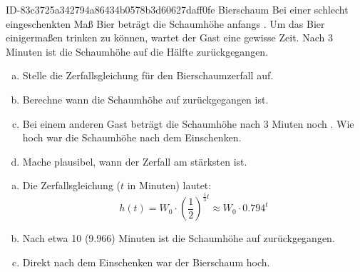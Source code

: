 \begin{exercise}
      {ID-83c3725a342794a86434b0578b3d60627daff0fe}
      {Bierschaum}
  \ifproblem\problem
    Bei einer schlecht eingeschenkten Maß Bier beträgt die Schaumhöhe
    anfangs . Um das Bier einigermaßen trinken zu können, wartet
    der Gast eine gewisse Zeit. Nach 3 Minuten ist die Schaumhöhe
    auf die Hälfte zurückgegangen.
    \begin{enumerate}[a)]
      \item Stelle die Zerfallsgleichung für den Bierschaumzerfall auf.
      \item Berechne wann die Schaumhöhe auf  zurückgegangen ist.
      \item Bei einem anderen Gast beträgt die Schaumhöhe nach 3
            Miuten noch . Wie hoch war die Schaumhöhe nach dem
            Einschenken.
      \item Mache plausibel, wann der Zerfall am stärksten ist.
    \end{enumerate}
  \fi
  \ifoutcome\outcome
    \begin{enumerate}[a)]
      \item Die Zerfallsgleichung ($t$ in Minuten) lautet:
            \begin{equation*}
              h(t)=W_{0}\cdot\left(\frac{1}{2}\right)^{\frac{1}{3}t}\approx W_{0}\cdot\num{0.794}^{t}
            \end{equation*}
      \item Nach etwa \num{10} (\num{9.966}) Minuten ist die Schaumhöhe auf 
            zurückgegangen.
      \item Direkt nach dem Einschenken war der Bierschaum  hoch.
    \end{enumerate}
  \fi
\end{exercise}
